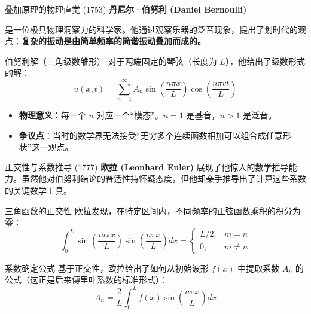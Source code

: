 \documentclass[
  ignorenonframetext,
]{beamer}
\providecommand{\tightlist}{%
  \setlength{\itemsep}{0pt}\setlength{\parskip}{0pt}}
\begin{document}
\begin{frame}{叠加原理的物理直觉 (1753)}
\protect{}\label{ux53e0ux52a0ux539fux7406ux7684ux7269ux7406ux76f4ux89c9-1753}
\textbf{丹尼尔·伯努利 (Daniel Bernoulli)}

是一位极具物理洞察力的科学家。他通过观察乐器的泛音现象，提出了划时代的观点：\textbf{复杂的振动是由简单频率的简谐振动叠加而成的。}

\begin{block}{伯努利解（三角级数雏形）}
\protect{}\label{ux4f2fux52aaux5229ux89e3ux4e09ux89d2ux7ea7ux6570ux96cfux5f62}
对于两端固定的琴弦（长度为 \(L\)），他给出了级数形式的解：
\[ u(x, t) = \sum_{n=1}^{\infty} A_n \sin\left(\frac{n\pi x}{L}\right) \cos\left(\frac{n\pi vt}{L}\right) \]

\begin{itemize}
\tightlist
\item
  \textbf{物理意义}：每一个 \(n\) 对应一个``模态''。\(n=1\)
  是基音，\(n > 1\) 是泛音。
\item
  \textbf{争议点}：当时的数学界无法接受``无穷多个连续函数相加可以组合成任意形状''这一观点。
\end{itemize}
\end{block}
\end{frame}

\begin{frame}{正交性与系数推导 (1777)}
\protect{}\label{ux6b63ux4ea4ux6027ux4e0eux7cfbux6570ux63a8ux5bfc-1777}
\textbf{欧拉 (Leonhard Euler)}
展现了他惊人的数学推导能力。虽然他对伯努利结论的普适性持怀疑态度，但他却亲手推导出了计算这些系数的关键数学工具。

\begin{block}{三角函数的正交性}
\protect{}\label{ux4e09ux89d2ux51fdux6570ux7684ux6b63ux4ea4ux6027}
欧拉发现，在特定区间内，不同频率的正弦函数乘积的积分为零：
\[ \int_0^L \sin\left(\frac{m\pi x}{L}\right) \sin\left(\frac{n\pi x}{L}\right) dx = \begin{cases} L/2, & m = n \\ 0, & m \neq n \end{cases} \]
\end{block}

\begin{block}{系数确定公式}
\protect{}\label{ux7cfbux6570ux786eux5b9aux516cux5f0f}
基于正交性，欧拉给出了如何从初始波形 \(f(x)\) 中提取系数 \(A_n\)
的公式（这正是后来傅里叶系数的标准形式）：
\[ A_n = \frac{2}{L} \int_0^L f(x) \sin\left(\frac{n\pi x}{L}\right) dx \]
\end{block}
\end{frame}
\end{document}
